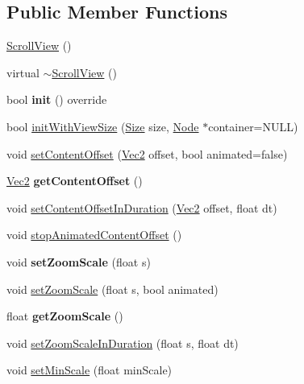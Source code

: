 \subsection*{Public Member Functions}
\begin{DoxyCompactItemize}
\item 
\hyperlink{classScrollView_afe9273a62ee4829f87d13a22e0576ac7}{Scroll\+View} ()
\item 
virtual \hyperlink{classScrollView_a4a5220ac36e0c7d03973be1bdde8d7a1}{$\sim$\+Scroll\+View} ()
\item 
\mbox{\label{classScrollView_a816fd4b60480d60ff4704e88299c40e9}} 
bool {\bfseries init} () override
\item 
bool \hyperlink{classScrollView_ae672005fc1d0d8dd3605d85e9f41a1d4}{init\+With\+View\+Size} (\hyperlink{classSize}{Size} size, \hyperlink{classNode}{Node} $\ast$container=N\+U\+LL)
\item 
void \hyperlink{classScrollView_ab8bc90e2fef0ba2e8ddf04778bb44dfe}{set\+Content\+Offset} (\hyperlink{classVec2}{Vec2} offset, bool animated=false)
\item 
\mbox{\label{classScrollView_ad5f0dcac1ccec63afe1c2dab0aea34c5}} 
\hyperlink{classVec2}{Vec2} {\bfseries get\+Content\+Offset} ()
\item 
void \hyperlink{classScrollView_ad98397d42075b810de17c35eb9843ec7}{set\+Content\+Offset\+In\+Duration} (\hyperlink{classVec2}{Vec2} offset, float dt)
\item 
void \hyperlink{classScrollView_a13c84492be7e7c8e06a29f6bd3bdcc7e}{stop\+Animated\+Content\+Offset} ()
\item 
\mbox{\label{classScrollView_a6e3020ab1ab0e1b59476753e2bdda04b}} 
void {\bfseries set\+Zoom\+Scale} (float s)
\item 
void \hyperlink{classScrollView_a9c9101d58eeb922bfe64b9b4cd01b314}{set\+Zoom\+Scale} (float s, bool animated)
\item 
\mbox{\label{classScrollView_a03153f8bab88f3fb4dc1176b7b018035}} 
float {\bfseries get\+Zoom\+Scale} ()
\item 
void \hyperlink{classScrollView_a04c9d8527dc9a0b883324c90d5b30ae2}{set\+Zoom\+Scale\+In\+Duration} (float s, float dt)
\item 
void \hyperlink{classScrollView_a4037050171ea3ffcd365024ef3e74009}{set\+Min\+Scale} (float min\+Scale)

\end{DoxyCompactItemize}
